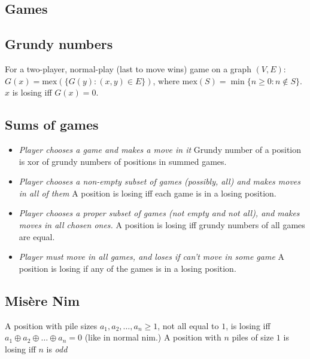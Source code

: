 \documentclass[12pt]{extarticle}
\begin{document}
\begin{multicols*}{2}


\section{Games}

\subsection{Grundy numbers}
For a two-player, normal-play (last to move wins) game on a graph $(V,E)$:
$G(x) = \mbox{mex}(\{ G(y) : (x, y) \in E \})$,
where $\mbox{mex}(S) = \min \{ n \ge 0: n \not\in S \}$.
$x$ is losing iff $G(x) = 0$.

\subsection{Sums of games}

\begin{itemize}
  \item
    \emph{Player chooses a game and makes a move in it}
    Grundy number of a position is xor of grundy numbers of positions in summed games.
  \item
    \emph{Player chooses a non-empty subset of games (possibly, all) and makes moves in all of them}
    A position is losing iff each game is in a losing position.
  \item
    \emph{Player chooses a proper subset of games (not empty and not all),
        and makes moves in all chosen ones.}
    A position is losing iff grundy numbers of all games are equal.
  \item
    \emph{Player must move in all games, and loses if can't move in some game}
    A position is losing if any of the games is in a losing position.
\end{itemize}


\subsection{Mis\`{e}re Nim}
A position with pile sizes $a_1, a_2, \dots, a_n \ge 1$,
not all equal to $1$, is losing iff $a_1 \oplus a_2 \oplus \dots \oplus a_n = 0$
(like in normal nim.)
A position with $n$ piles of size $1$ is losing iff $n$ is \emph{odd}


\end{multicols*}
\end{document}
